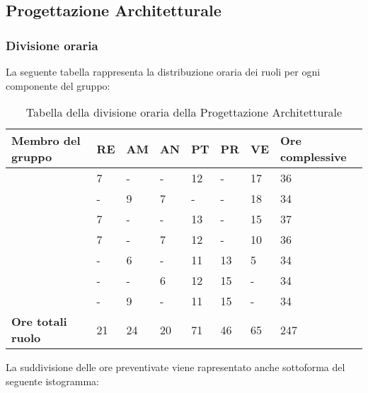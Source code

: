 \subsection{Progettazione Architetturale}

\subsubsection{Divisione oraria}
La seguente tabella rappresenta la distribuzione oraria dei ruoli per ogni componente del gruppo:
\renewcommand{\arraystretch}{2}
\begin{longtable}[h!] { C{4cm} C{1cm} C{1cm} C{1cm} C{1cm} C{1cm} C{1cm} C{3cm}}
\caption{Tabella della divisione oraria della Progettazione Architetturale}\\
\rowcolor{\primaryColor}

\textcolor{\secondaryColor}{\textbf{Membro del gruppo}} & 
\textcolor{\secondaryColor}{\textbf{RE}} & 
\textcolor{\secondaryColor}{\textbf{AM}} & 
\textcolor{\secondaryColor}{\textbf{AN}} & 
\textcolor{\secondaryColor}{\textbf{PT}} & 
\textcolor{\secondaryColor}{\textbf{PR}} & 
\textcolor{\secondaryColor}{\textbf{VE}} & 
\textcolor{\secondaryColor}{\textbf{Ore complessive}}\\	
\endhead
        
\AW{}                     & 7 & - & - & 12 & - & 17 & 36 \\
\AT{}                     & - & 9 & 7 & - & - & 18 & 34 \\
\AD{}                     & 7 & - & - & 13 & - & 15 & 37 \\
\EC{}                     & 7 & - & 7 & 12 & - & 10 & 36 \\
\EM{}                     & - & 6 & - & 11 & 13 & 5 & 34 \\
\FP{}                     & - & - & 6 & 12 & 15 & - & 34 \\
\GG{}                     & - & 9 & - & 11 & 15 & - & 34 \\
\textbf{Ore totali ruolo} & 21 & 24 & 20 & 71 & 46 & 65 & 247

		
\end{longtable}
La suddivisione delle ore preventivate viene rapresentato anche sottoforma del seguente istogramma:
